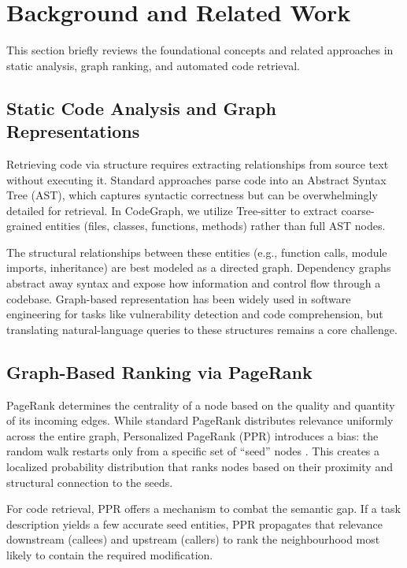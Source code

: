 \section{Background and Related Work}
\label{sec:background}

This section briefly reviews the foundational concepts and related approaches in static analysis, graph ranking, and automated code retrieval.

\subsection{Static Code Analysis and Graph Representations}

Retrieving code via structure requires extracting relationships from source text without executing it. Standard approaches parse code into an Abstract Syntax Tree (AST), which captures syntactic correctness but can be overwhelmingly detailed for retrieval. In CodeGraph, we utilize Tree-sitter \cite{treesitter} to extract coarse-grained entities (files, classes, functions, methods) rather than full AST nodes.

The structural relationships between these entities (e.g., function calls, module imports, inheritance) are best modeled as a directed graph. Dependency graphs abstract away syntax and expose how information and control flow through a codebase. Graph-based representation has been widely used in software engineering for tasks like vulnerability detection and code comprehension, but translating natural-language queries to these structures remains a core challenge.

\subsection{Graph-Based Ranking via PageRank}

PageRank determines the centrality of a node based on the quality and quantity of its incoming edges. While standard PageRank distributes relevance uniformly across the entire graph, Personalized PageRank (PPR) introduces a bias: the random walk restarts only from a specific set of ``seed'' nodes \cite{page1999pagerank}. This creates a localized probability distribution that ranks nodes based on their proximity and structural connection to the seeds.

For code retrieval, PPR offers a mechanism to combat the semantic gap. If a task description yields a few accurate seed entities, PPR propagates that relevance downstream (callees) and upstream (callers) to rank the neighbourhood most likely to contain the required modification.

